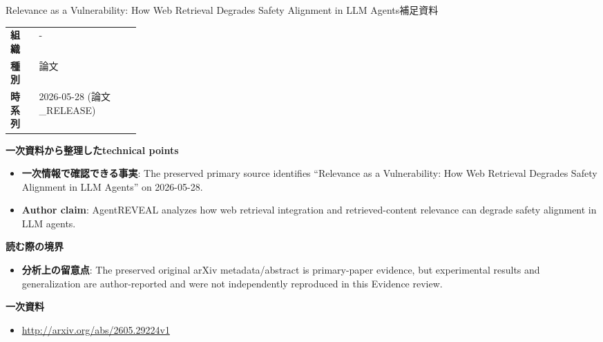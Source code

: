 \begin{technicalnote}{Relevance as a Vulnerability: How Web Retrieval Degrades Safety Alignment in LLM Agents}{補足資料}
\begin{tabularx}{\linewidth}{@{}>{\bfseries}p{0.22\linewidth}X@{}}
組織 & - \\
種別 & 論文 \\
時系列 & 2026-05-28 (論文\_RELEASE) \\
\end{tabularx}
\smallskip
{\bfseries 一次資料から整理したtechnical points}
\begin{itemize}[leftmargin=1.5em,itemsep=0.35em]
\item \textbf{一次情報で確認できる事実}: The preserved primary source identifies “Relevance as a Vulnerability: How Web Retrieval Degrades Safety Alignment in LLM Agents” on 2026-05-28.
\item \textbf{Author claim}: AgentREVEAL analyzes how web retrieval integration and retrieved-content relevance can degrade safety alignment in LLM agents.
\end{itemize}
{\bfseries 読む際の境界}
\begin{itemize}[leftmargin=1.5em,itemsep=0.35em]
\item \textbf{分析上の留意点}: The preserved original arXiv metadata/abstract is primary-paper evidence, but experimental results and generalization are author-reported and were not independently reproduced in this Evidence review.
\end{itemize}
{\bfseries 一次資料}
\begingroup\sloppy
\begin{itemize}[leftmargin=1.5em,itemsep=0.25em]
\item {\scriptsize\url{http://arxiv.org/abs/2605.29224v1}}
\end{itemize}
\endgroup
\end{technicalnote}
\medskip


